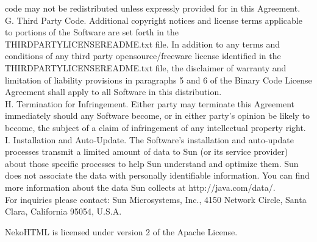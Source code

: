 {code may not be redistributed unless expressly provided for in this
Agreement.
\\[4pt]
G. Third Party Code. Additional copyright notices and license terms
applicable to portions of the Software are set forth in the
THIRDPARTYLICENSEREADME.txt file. In addition to any terms and
conditions of any third party opensource/freeware license identified
in the THIRDPARTYLICENSEREADME.txt file, the disclaimer of warranty
and limitation of liability provisions in paragraphs 5 and 6 of the
Binary Code License Agreement shall apply to all Software in this
distribution.
\\[4pt]
H. Termination for Infringement. Either party may terminate this
Agreement immediately should any Software become, or in either party's
opinion be likely to become, the subject of a claim of infringement of
any intellectual property right.
\\[4pt]
I. Installation and Auto-Update.  The Software's installation and
auto-update processes transmit a limited amount of data to Sun (or its
service provider) about those specific processes to help Sun
understand and optimize them.  Sun does not associate the data with
personally identifiable information.  You can find more information
about the data Sun collects at http://java.com/data/.
\\[4pt]
For inquiries please contact: Sun Microsystems, Inc., 4150 Network
Circle, Santa Clara, California 95054, U.S.A.
}


\setlength{\baselineskip}{\oldbaselineskip}
\noindent
NekoHTML is licensed under version 2 of the Apache License.
\\

